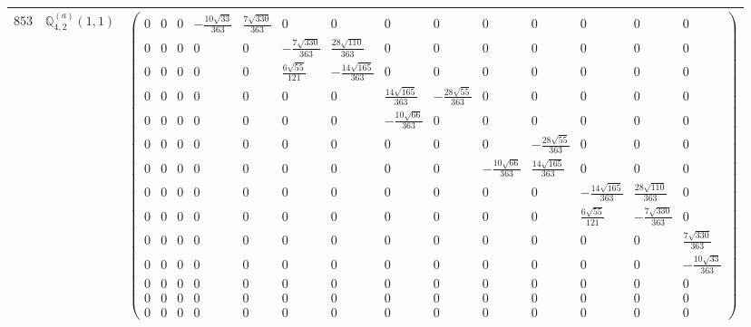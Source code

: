\documentclass[fleqn,8pt,landscape]{jsarticle}
\begin{document}
\begin{center}
\begin{longtable}{ccc}
$ 853 $ & $ \mathbb{Q}_{4,2}^{(a)}(1,1) $ & $ \begin{pmatrix} 0 & 0 & 0 & - \frac{10 \sqrt{33}}{363} & \frac{7 \sqrt{330}}{363} & 0 & 0 & 0 & 0 & 0 & 0 & 0 & 0 & 0 \\ 0 & 0 & 0 & 0 & 0 & - \frac{7 \sqrt{330}}{363} & \frac{28 \sqrt{110}}{363} & 0 & 0 & 0 & 0 & 0 & 0 & 0 \\ 0 & 0 & 0 & 0 & 0 & \frac{6 \sqrt{55}}{121} & - \frac{14 \sqrt{165}}{363} & 0 & 0 & 0 & 0 & 0 & 0 & 0 \\ 0 & 0 & 0 & 0 & 0 & 0 & 0 & \frac{14 \sqrt{165}}{363} & - \frac{28 \sqrt{55}}{363} & 0 & 0 & 0 & 0 & 0 \\ 0 & 0 & 0 & 0 & 0 & 0 & 0 & - \frac{10 \sqrt{66}}{363} & 0 & 0 & 0 & 0 & 0 & 0 \\ 0 & 0 & 0 & 0 & 0 & 0 & 0 & 0 & 0 & 0 & - \frac{28 \sqrt{55}}{363} & 0 & 0 & 0 \\ 0 & 0 & 0 & 0 & 0 & 0 & 0 & 0 & 0 & - \frac{10 \sqrt{66}}{363} & \frac{14 \sqrt{165}}{363} & 0 & 0 & 0 \\ 0 & 0 & 0 & 0 & 0 & 0 & 0 & 0 & 0 & 0 & 0 & - \frac{14 \sqrt{165}}{363} & \frac{28 \sqrt{110}}{363} & 0 \\ 0 & 0 & 0 & 0 & 0 & 0 & 0 & 0 & 0 & 0 & 0 & \frac{6 \sqrt{55}}{121} & - \frac{7 \sqrt{330}}{363} & 0 \\ 0 & 0 & 0 & 0 & 0 & 0 & 0 & 0 & 0 & 0 & 0 & 0 & 0 & \frac{7 \sqrt{330}}{363} \\ 0 & 0 & 0 & 0 & 0 & 0 & 0 & 0 & 0 & 0 & 0 & 0 & 0 & - \frac{10 \sqrt{33}}{363} \\ 0 & 0 & 0 & 0 & 0 & 0 & 0 & 0 & 0 & 0 & 0 & 0 & 0 & 0 \\ 0 & 0 & 0 & 0 & 0 & 0 & 0 & 0 & 0 & 0 & 0 & 0 & 0 & 0 \\ 0 & 0 & 0 & 0 & 0 & 0 & 0 & 0 & 0 & 0 & 0 & 0 & 0 & 0 \end{pmatrix} $ \\ \hline

\end{longtable}
\end{center}
\end{document}
